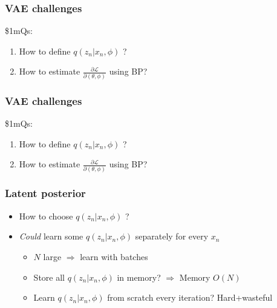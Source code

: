 \documentclass[xcolor=table,dvipsnames]{beamer}
\begin{document}
\begin{frame}
    \frametitle{VAE challenges}
    \$1mQs:
    \begin{enumerate}
        \setlength{\itemsep}{2em}
        \vspace{2em}
        \item How to define $q(z_n \vert x_n, \phi)$ ?
        \item How to estimate $\frac{\partial\mathcal{L}}{\partial(\theta,\phi)}$ using BP?
    \end{enumerate}
\end{frame}

\begin{frame}
    \frametitle{VAE challenges}
    \$1mQs:
    \begin{enumerate}
        \setlength{\itemsep}{2em}
        \vspace{2em}
        \item How to define $q(z_n \vert x_n, \phi)$ ?
        \item \textcolor{black!30}{How to estimate $\frac{\partial\mathcal{L}}{\partial(\theta,\phi)}$ using BP?}
    \end{enumerate}
\end{frame}

\begin{frame}[t]
    \frametitle{Latent posterior}
    \begin{itemize}
        \setlength{\itemsep}{1em}
        \item How to choose $q(z_n \vert x_n, \phi)$ ?
        \item \emph{Could} learn some $q(z_n \vert x_n, \phi)$ separately for every $x_n$
        \begin{itemize}
            \setlength{\itemsep}{1em}
            \vspace{1em}
            \item $N$ large $\Rightarrow$ learn with batches
            \item Store all $q(z_n \vert x_n, \phi)$ in memory? $\Rightarrow$ Memory $O(N)$ \Sadey
            \item Learn $q(z_n \vert x_n, \phi)$ from scratch every iteration? Hard+wasteful \Sadey
        \end{itemize}
    \end{itemize}
\end{frame}
\end{document}
